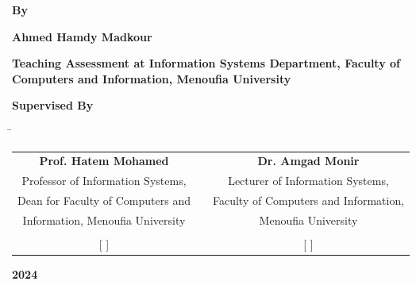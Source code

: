 \begin{titlepage}
\begin{center}
        \textbf{\Large By} \\
        \vspace{0.3cm}
        
        \textbf{\LARGE  Ahmed Hamdy Madkour} \\
        \vspace{0.3cm}
        
        \textbf{\large \normalfont Teaching Assessment at Information Systems Department, Faculty of Computers and Information, Menoufia University} \\
        \vspace{0.7cm}
        
        \textbf{\Large Supervised By} \\

    \begin{tabbing}
        \hspace{1cm} %
        \= \kill %
        \begin{tabular}{ccc} %
            \textbf{Prof. Hatem Mohamed} && \textbf{Dr. Amgad Monir} \\
            Professor of Information Systems,  && Lecturer of Information Systems,\\
             Dean for Faculty of Computers and &&  Faculty of Computers and Information,
            \\
            Information, Menoufia University  && Menoufia University \\\\
            \hspace{0.1cm} [ \hspace{3.5cm} ] && \hspace{0.1cm} [ \hspace{3.5cm} ]
        \end{tabular}
    \end{tabbing}
    \vspace{0.4cm}
    \textbf{\Large 2024} 
    \end{center}
\end{titlepage}
